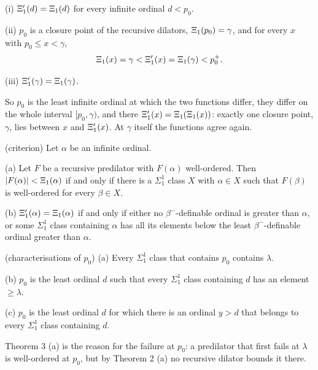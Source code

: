 \documentclass[11pt]{article}
\begin{document}
\begin{statement} (i) $\Xi'_1(d) = \Xi_1(d)$ for every infinite ordinal $d < p_0$.

(ii) $p_0$ is a closure point of the recursive dilators, $\Xi_1(p_0) = \gamma$, and for every $x$ with
$p_0 \le x < \gamma$,
\[ \Xi_1(x) = \gamma < \Xi'_1(x) = \Xi_1(\gamma) < p_0^+ . \]

(iii) $\Xi'_1(\gamma) = \Xi_1(\gamma)$.
\end{statement}

So $p_0$ is the least infinite ordinal at which the two functions differ, they differ on the whole interval
$[p_0, \gamma)$, and there $\Xi'_1(x) = \Xi_1(\Xi_1(x))$: exactly one closure point, $\gamma$, lies between $x$ and
$\Xi'_1(x)$. At $\gamma$ itself the functions agree again.

\begin{statement} (criterion) Let $\alpha$ be an infinite ordinal.

(a) Let $F$ be a recursive predilator with $F(\alpha)$ well-ordered. Then $|F(\alpha)| < \Xi_1(\alpha)$ if and only if
there is a $\Sigma^1_1$ class $X$ with $\alpha \in X$ such that $F(\beta)$ is well-ordered for every $\beta \in X$.

(b) $\Xi'_1(\alpha) = \Xi_1(\alpha)$ if and only if either no $\beta^-$-definable ordinal is greater than $\alpha$, or
some $\Sigma^1_1$ class containing $\alpha$ has all its elements below the least $\beta^-$-definable ordinal greater
than $\alpha$.
\end{statement}

\begin{statement} (characterisations of $p_0$) (a) Every $\Sigma^1_1$ class that contains $p_0$
contains $\lambda$.

(b) $p_0$ is the least ordinal $d$ such that every $\Sigma^1_1$ class containing $d$ has an element $\ge \lambda$.

(c) $p_0$ is the least ordinal $d$ for which there is an ordinal $y > d$ that belongs to every $\Sigma^1_1$ class
containing $d$.
\end{statement}

Theorem 3 (a) is the reason for the failure at $p_0$: a predilator that first fails at $\lambda$ is well-ordered at
$p_0$, but by Theorem 2 (a) no recursive dilator bounds it there.
\end{document}
